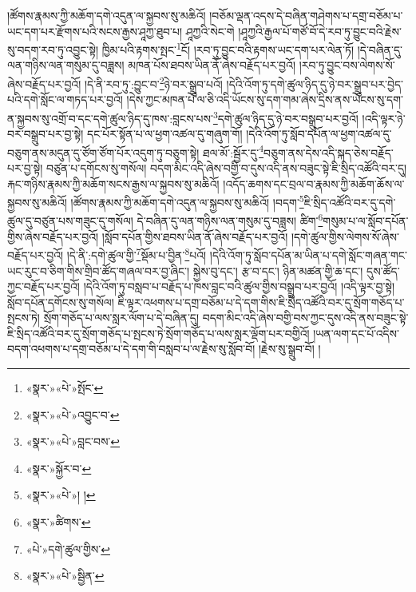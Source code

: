 །ཚོགས་རྣམས་ཀྱི་མཆོག་དགེ་འདུན་ལ་སྐྱབས་སུ་མཆིའོ། །བཅོམ་ལྡན་འདས་དེ་བཞིན་གཤེགས་པ་དགྲ་བཅོམ་པ་ཡང་དག་པར་རྫོགས་པའི་སངས་རྒྱས་ཤཱཀྱ་ཐུབ་པ། ཤཱཀྱའི་སེང་གེ །ཤཱཀྱའི་རྒྱལ་པོ་གཙོ་བོ་དེ་རབ་ཏུ་བྱུང་བའི་རྗེས་སུ་བདག་རབ་ཏུ་འབྱུང་སྟེ། ཁྱིམ་པའི་རྟགས་སྤང་\footnote{«སྣར་»«པེ་»སྤོང་}ངོ། །རབ་ཏུ་བྱུང་བའི་རྟགས་ཡང་དག་པར་ལེན་ཏོ། །དེ་བཞིན་དུ་ལན་གཉིས་ལན་གསུམ་དུ་བཟླས། མཁན་པོས་ཐབས་ཡིན་ནོ་ཞེས་བརྗོད་པར་བྱའོ། །རབ་ཏུ་བྱུང་བས་ལེགས་སོ་ཞེས་བརྗོད་པར་བྱའོ། །དེ་ནི་རབ་ཏུ་:བྱུང་བ་\footnote{«སྣར་»«པེ་»འབྱུང་བ་}ཉེ་བར་སྒྲུབ་པའོ། །དེའི་འོག་ཏུ་དགེ་ཚུལ་ཉིད་དུ་ཉེ་བར་སྒྲུབ་པར་བྱེད་པའི་དགེ་སློང་ལ་གཏད་པར་བྱའོ། །དེས་ཀྱང་མཁན་པོ་ལ་ཅི་འདི་ཡོངས་སུ་དག་གམ་ཞེས་དྲིས་ནས་ཡོངས་སུ་དག་ན་སྐྱབས་སུ་འགྲོ་བ་དང་དགེ་ཚུལ་ཉིད་དུ་ཁས་:བླངས་པས་\footnote{«སྣར་»«པེ་»བླང་བས་}དགེ་ཚུལ་ཉིད་དུ་ཉེ་བར་བསྒྲུབ་པར་བྱའོ། །འདི་ལྟར་ཉེ་བར་བསྒྲུབ་པར་བྱ་སྟེ། དང་པོར་སྟོན་པ་ལ་ཕྱག་འཚལ་དུ་གཞུག་གོ། །དེའི་འོག་ཏུ་སློབ་དཔོན་ལ་ཕྱག་འཚལ་དུ་བཅུག་ནས་མདུན་དུ་ཙོག་ཙོག་པོར་འདུག་ཏུ་བཅུག་སྟེ། ཐལ་མོ་:སྦྱོར་དུ་\footnote{«སྣར་»སྐྱོར་བ་}བཅུག་ནས་དེས་འདི་སྐད་ཅེས་བརྗོད་པར་བྱ་སྟེ། བཙུན་པ་དགོངས་སུ་གསོལ། བདག་མིང་འདི་ཞེས་བགྱི་བ་དུས་འདི་ནས་བཟུང་སྟེ་ཇི་སྲིད་འཚོའི་བར་དུ། རྐང་གཉིས་རྣམས་ཀྱི་མཆོག་སངས་རྒྱས་ལ་སྐྱབས་སུ་མཆིའོ། །འདོད་ཆགས་དང་བྲལ་བ་རྣམས་ཀྱི་མཆོག་ཆོས་ལ་སྐྱབས་སུ་མཆིའོ། །ཚོགས་རྣམས་ཀྱི་མཆོག་དགེ་འདུན་ལ་སྐྱབས་སུ་མཆིའོ། །བདག་\footnote{«སྣར་»«པེ་»། །}ཇི་སྲིད་འཚོའི་བར་དུ་དགེ་ཚུལ་དུ་བཙུན་པས་གཟུང་དུ་གསོལ། དེ་བཞིན་དུ་ལན་གཉིས་ལན་གསུམ་དུ་བཟླས། ཚིག་\footnote{«སྣར་»ཚིགས་}གསུམ་པ་ལ་སློབ་དཔོན་གྱིས་ཞེས་བརྗོད་པར་བྱའོ། །སློབ་དཔོན་གྱིས་ཐབས་ཡིན་ནོ་ཞེས་བརྗོད་པར་བྱའོ། །དགེ་ཚུལ་གྱིས་ལེགས་སོ་ཞེས་བརྗོད་པར་བྱའོ། །དེ་ནི་:དགེ་ཚུལ་གྱི་\footnote{«པེ་»དགེ་ཚུལ་གྱིས་}སྡོམ་པ་བྱིན་\footnote{«སྣར་»«པེ་»སྦྱིན་}པའོ། །དེའི་འོག་ཏུ་སློབ་དཔོན་མ་ཡིན་པ་དགེ་སློང་གཞན་གང་ཡང་རུང་བ་ཅིག་གིས་གྲིབ་ཚོད་གཞལ་བར་བྱ་ཞིང་། སྐྱེས་བུ་དང་། རྩ་བ་དང་། ཉིན་མཚན་གྱི་ཆ་དང་། དུས་ཚོད་ཀྱང་བརྗོད་པར་བྱའོ། །དེའི་འོག་ཏུ་བསླབ་པ་བརྗོད་པ་ཁས་བླང་བའི་ཚུལ་གྱིས་བསྒྲུབ་པར་བྱའོ། །འདི་ལྟར་བྱ་སྟེ། སློབ་དཔོན་དགོངས་སུ་གསོལ། ཇི་ལྟར་འཕགས་པ་དགྲ་བཅོམ་པ་དེ་དག་གིས་ཇི་སྲིད་འཚོའི་བར་དུ་སྲོག་གཅོད་པ་སྤངས་ཏེ། སྲོག་གཅོད་པ་ལས་སླར་ལོག་པ་དེ་བཞིན་དུ། བདག་མིང་འདི་ཞེས་བགྱི་བས་ཀྱང་དུས་འདི་ནས་བཟུང་སྟེ་ཇི་སྲིད་འཚོའི་བར་དུ་སྲོག་གཅོད་པ་སྤངས་ཏེ་སྲོག་གཅོད་པ་ལས་སླར་ལྡོག་པར་བགྱིའོ། །ཡན་ལག་དང་པོ་འདིས་བདག་འཕགས་པ་དགྲ་བཅོམ་པ་དེ་དག་གི་བསླབ་པ་ལ་རྗེས་སུ་སློབ་བོ། །རྗེས་སུ་སྒྲུབ་བོ། །
